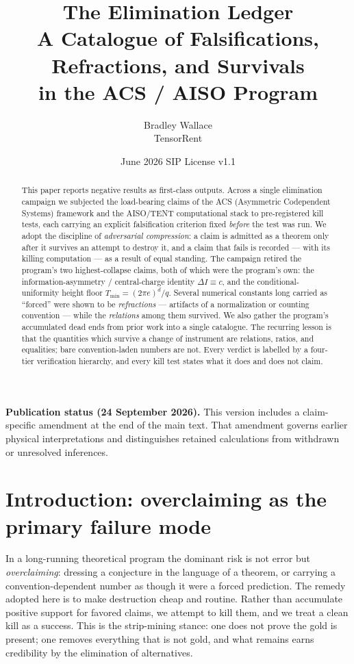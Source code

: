 \documentclass[11pt]{article}
\title{\textbf{The Elimination Ledger}\\[2pt]
\large A Catalogue of Falsifications, Refractions, and Survivals\\
in the ACS / AISO Program}
\author{Bradley Wallace \\ \small TensorRent}
\date{June 2026 \quad\textbar\quad SIP License v1.1}
\newcommand{\DI}{\Delta I}
\newcommand{\Tmin}{T_{\min}}
\begin{document}
\maketitle

\begin{abstract}
This paper reports negative results as first-class outputs. Across a single
elimination campaign we subjected the load-bearing claims of the ACS (Asymmetric
Codependent Systems) framework and the AISO/TENT computational stack to
pre-registered kill tests, each carrying an explicit falsification criterion fixed
\emph{before} the test was run. We adopt the discipline of \emph{adversarial
compression}: a claim is admitted as a theorem only after it survives an attempt to
destroy it, and a claim that fails is recorded --- with its killing computation --- as
a result of equal standing. The campaign retired the program's two highest-collapse
claims, both of which were the program's own: the information-asymmetry / central-charge
identity $\DI \equiv c$, and the conditional-uniformity height floor
$\Tmin=(2\pi e)^d/q$. Several numerical constants long carried as ``forced'' were shown
to be \emph{refractions} --- artifacts of a normalization or counting convention --- while
the \emph{relations} among them survived. We also gather the program's accumulated dead
ends from prior work into a single catalogue. The recurring lesson is that the
quantities which survive a change of instrument are relations, ratios, and equalities;
bare convention-laden numbers are not. Every verdict is labelled by a four-tier
verification hierarchy, and every kill test states what it does and does not claim.
\end{abstract}
\par\smallskip\noindent\textbf{Publication status (24 September 2026).}
This version includes a claim-specific amendment at the end of the main text.
That amendment governs earlier physical interpretations and distinguishes
retained calculations from withdrawn or unresolved inferences.\par\smallskip


\tableofcontents

\section{Introduction: overclaiming as the primary failure mode}

In a long-running theoretical program the dominant risk is not error but
\emph{overclaiming}: dressing a conjecture in the language of a theorem, or carrying a
convention-dependent number as though it were a forced prediction. The remedy adopted
here is to make destruction cheap and routine. Rather than accumulate positive support
for favored claims, we attempt to kill them, and we treat a clean kill as a success.
This is the strip-mining stance: one does not prove the gold is present; one removes
everything that is not gold, and what remains earns credibility by the elimination of
alternatives.
\end{document}
